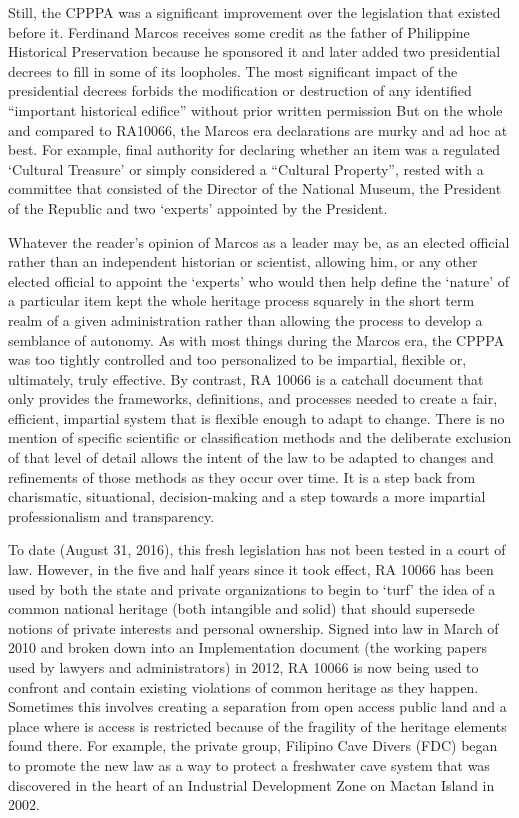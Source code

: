 \documentclass[spanish]{ijsra}
\begin{document}
Still, the CPPPA was a significant improvement over the legislation that existed before it. Ferdinand Marcos receives some credit as the father of Philippine Historical Preservation because he sponsored it and later added two presidential decrees %
to fill in some of its loopholes. The most significant impact of the presidential decrees forbids the modification or destruction of any identified “important historical edifice” without prior written permission %
But on the whole and compared to RA10066, the Marcos era declarations are murky and ad hoc at best. For example, final authority for declaring whether an item was a regulated ‘Cultural Treasure’ or simply considered a “Cultural Property”, rested with a committee that consisted of the Director of the National Museum, the President of the Republic and two ‘experts’ appointed by the President. 

Whatever the reader’s opinion of Marcos as a leader may be, as an elected official rather than an independent historian or scientist, allowing him, or any other elected official to appoint the ‘experts’ who would then help define the ‘nature’ of a particular item kept the whole heritage process squarely in the short term realm of a given administration rather than allowing the process to develop a semblance of autonomy. As with most things during the Marcos era, the CPPPA was too tightly controlled and too personalized to be impartial, flexible or, ultimately, truly effective. By contrast, RA 10066 is a catchall document that only provides the frameworks, definitions, and processes needed to create a fair, efficient, impartial system that is flexible enough to adapt to change. There is no mention of specific scientific or classification methods and the deliberate exclusion of that level of detail allows the intent of the law to be adapted to changes and refinements of those methods as they occur over time. It is a step back from charismatic, situational, decision-making and a step towards a more impartial professionalism and transparency.

To date (August 31, 2016), this fresh legislation has not been tested in a court of law. However, in the five and half years since it took effect, RA 10066 has been used by both the state and private organizations to begin to ‘turf’ the idea of a common national heritage (both intangible and solid) that should supersede notions of private interests and personal ownership. Signed into law in March of 2010
 and broken down into an Implementation document (the working papers used by lawyers and administrators) in 2012, 
 RA 10066 is now being used to confront and contain existing violations of common heritage as they happen. Sometimes this involves creating a separation from open access public land and a place where is access is restricted because of the fragility of the heritage elements found there. For example, the private group, Filipino Cave Divers (FDC) began to promote the new law as a way to protect a freshwater cave system that was discovered in the heart of an Industrial Development Zone on Mactan Island in 2002. 
\end{document}
